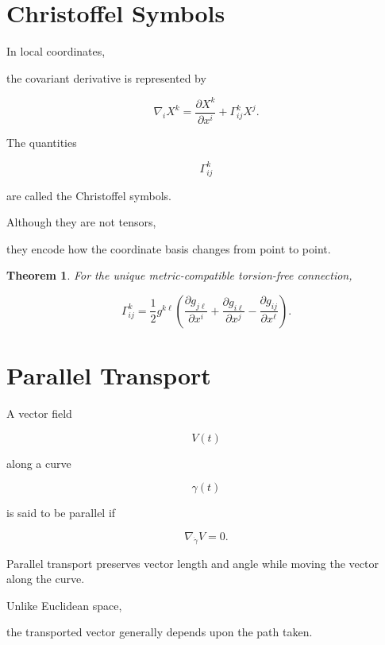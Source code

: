 \documentclass[11pt,fleqn]{book}
\numberwithin{equation}{chapter}
\theoremstyle{plain}
\newtheorem{theorem}{Theorem}[chapter]
\theoremstyle{definition}
\theoremstyle{remark}
\begin{document}

\section{Christoffel Symbols}

In local coordinates,

the covariant derivative is represented by

\[
\boxed{
\nabla_iX^k
=
\frac{\partial X^k}{\partial x^i}
+
\Gamma^k_{ij}X^j.
}
\]

The quantities

\[
\Gamma^k_{ij}
\]

are called the Christoffel symbols.

Although they are not tensors,

they encode how the coordinate basis changes from point to point.


\begin{theorem}

For the unique metric-compatible torsion-free connection,

\[
\boxed{
\Gamma^k_{ij}
=
\frac12
g^{k\ell}
\left(
\frac{\partial g_{j\ell}}{\partial x^i}
+
\frac{\partial g_{i\ell}}{\partial x^j}
-
\frac{\partial g_{ij}}{\partial x^\ell}
\right).
}
\]

\end{theorem}


\section{Parallel Transport}

A vector field

\[
V(t)
\]

along a curve

\[
\gamma(t)
\]

is said to be parallel if

\[
\boxed{
\nabla_{\dot\gamma}V
=
0.
}
\]

Parallel transport preserves vector length and angle while moving the
vector along the curve.

Unlike Euclidean space,

the transported vector generally depends upon the path taken.
\end{document}
